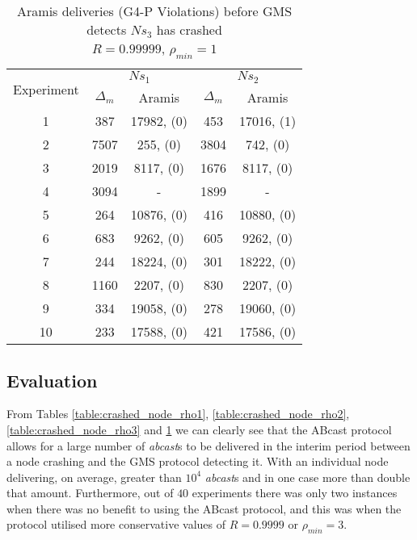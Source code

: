 \begin{table}[p]
    \begin{center}
        \renewcommand{\arraystretch}{1.25}
        \begin{tabular}{|c|c|c|c|c|}
            \hline
            \multirow{2}{*}{Experiment} & \multicolumn{2}{|c|}{$Ns_1$} & \multicolumn{2}{|c|}{$Ns_2$} \\ \cline{2-5}
                                                       & $\Delta_m$&\textsf{Aramis} & $\Delta_m$&\textsf{Aramis} \\ \hline \hline
            1 & 387 & 17982, (0) & 453 & 17016, (1)  \\ \hline
            2 & 7507 & 255, (0) & 3804 & 742, (0)  \\ \hline
            3 & 2019 & 8117, (0) & 1676 & 8117, (0)  \\ \hline
            4 & 3094 & - & 1899 & -  \\ \hline
            5 & 264 & 10876, (0) & 416 & 10880, (0)  \\ \hline
            6 & 683 & 9262, (0) & 605 & 9262, (0)  \\ \hline
            7 & 244 & 18224, (0) & 301 & 18222, (0)  \\ \hline
            8 & 1160 & 2207, (0) & 830 & 2207, (0)  \\ \hline
            9 & 334 & 19058, (0) & 278 & 19060, (0)  \\ \hline
            10 & 233 & 17588, (0) & 421 & 17586, (0)  \\ \hline
        \end{tabular}
        \caption{\textsf{Aramis} deliveries (G4-P Violations) before GMS detects $Ns_3$ has crashed \\ $R=0.99999$, $\rho_{min}=1$}
        \label{table:crashed_node_R.99999}
    \end{center}
\end{table}

    \subsection{Evaluation}
    From Tables \ref{table:crashed_node_rho1}, \ref{table:crashed_node_rho2},  \ref{table:crashed_node_rho3} and \ref{table:crashed_node_R.99999} we can clearly see that the \textsf{ABcast} protocol allows for a large number of \emph{abcast}s to be delivered in the interim period between a node crashing and the GMS protocol detecting it.  With an individual node delivering, on average, greater than $10^4$ \emph{abcast}s and in one case more than double that amount.  Furthermore, out of $40$ experiments there was only two instances when there was no benefit to using the \textsf{ABcast} protocol, and this was when the protocol utilised more conservative values of $R=0.9999$ or $\rho_{min}=3$.  
    
